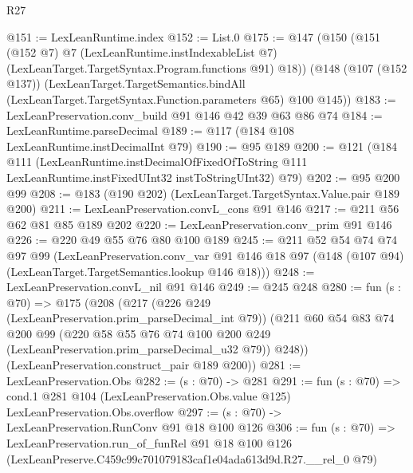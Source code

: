 \begin{lexlean}{R27}
\begin{coremodule}
@151 := LexLeanRuntime.index
@152 := List.{0}
@175 := @147
    (@150
      (@151
        (@152 @7)
        @7
        (LexLeanRuntime.instIndexableList @7)
        (LexLeanTarget.TargetSyntax.Program.functions @91)
        @18))
    (@148
      (@107 (@152 @137))
      (LexLeanTarget.TargetSemantics.bindAll
        (LexLeanTarget.TargetSyntax.Function.parameters @65)
        @100
        @145))
@183 := LexLeanPreservation.conv_build @91 @146 @42 @39 @63 @86 @74
@184 := LexLeanRuntime.parseDecimal
@189 := @117 (@184 @108 LexLeanRuntime.instDecimalInt @79)
@190 := @95 @189
@200 := @121
    (@184
      @111
      (LexLeanRuntime.instDecimalOfFixedOfToString
        @111
        LexLeanRuntime.instFixedUInt32
        instToStringUInt32)
      @79)
@202 := @95 @200 @99
@208 := @183 (@190 @202) (LexLeanTarget.TargetSyntax.Value.pair @189 @200)
@211 := LexLeanPreservation.convL_cons @91 @146
@217 := @211 @56 @62 @81 @85 @189 @202
@220 := LexLeanPreservation.conv_prim @91 @146
@226 := @220 @49 @55 @76 @80 @100 @189
@245 := @211
    @52
    @54
    @74
    @74
    @97
    @99
    (LexLeanPreservation.conv_var
      @91
      @146
      @18
      @97
      (@148 (@107 @94) (LexLeanTarget.TargetSemantics.lookup @146 @18)))
@248 := LexLeanPreservation.convL_nil @91 @146
@249 := @245 @248
@280 := fun (s : @70) =>
  @175
    (@208
      (@217
        (@226 @249 (LexLeanPreservation.prim_parseDecimal_int @79))
        (@211
          @60
          @54
          @83
          @74
          @200
          @99
          (@220 @58 @55 @76 @74 @100 @200 @249 (LexLeanPreservation.prim_parseDecimal_u32 @79))
          @248))
      (LexLeanPreservation.construct_pair @189 @200))
@281 := LexLeanPreservation.Obs
@282 := (s : @70) -> @281
@291 := fun (s : @70) =>
  cond.{1} @281 @104 (LexLeanPreservation.Obs.value @125) LexLeanPreservation.Obs.overflow
@297 := (s : @70) -> LexLeanPreservation.RunConv @91 @18 @100 @126
@306 := fun (s : @70) =>
  LexLeanPreservation.run_of_funRel
    @91
    @18
    @100
    @126
    (LexLeanPreserve.C459c99c701079183caf1e04ada613d9d.R27.__rel_0 @79)
\end{coremodule}
\end{lexlean}
